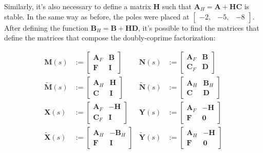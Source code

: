 \documentclass{scrreprt}
\begin{document}
Similarly, it's also necessary to define a matrix $\boldsymbol{H}$ such that $\boldsymbol{A}_H = \boldsymbol{A} + \boldsymbol{HC}$ is stable. In the same way as before, the poles were placed at $\begin{bmatrix}
    -2, & -5, & -8
\end{bmatrix}$. After defining the function $\boldsymbol{B}_H = \boldsymbol{B}+ \boldsymbol{HD}$, it's possible to find the matrices that define the matrices that compose the doubly-coprime factorization:

\begin{align*}
\mathbf{M}(s) &:= \left[ \begin{array}{c|c} \mathbf{A}_F & \mathbf{B} \\ \hline \mathbf{F} & \mathbf{I} \end{array} \right] &
\mathbf{N}(s) &:= \left[ \begin{array}{c|c} \mathbf{A}_F & \mathbf{B} \\ \hline \mathbf{C}_F & \mathbf{D} \end{array} \right] \\[1em]
\tilde{\mathbf{M}}(s) &:= \left[ \begin{array}{c|c} \mathbf{A}_H & \mathbf{H} \\ \hline \mathbf{C} & \mathbf{I} \end{array} \right] &
\tilde{\mathbf{N}}(s) &:= \left[ \begin{array}{c|c} \mathbf{A}_H & \mathbf{B}_H \\ \hline \mathbf{C} & \mathbf{D} \end{array} \right] \\[1.5em]
\mathbf{X}(s) &:= \left[ \begin{array}{c|c} \mathbf{A}_F & -\mathbf{H} \\ \hline \mathbf{C}_F & \mathbf{I} \end{array} \right] &
\mathbf{Y}(s) &:= \left[ \begin{array}{c|c} \mathbf{A}_F & -\mathbf{H} \\ \hline \mathbf{F} & \mathbf{0} \end{array} \right] \\[1em]
\tilde{\mathbf{X}}(s) &:= \left[ \begin{array}{c|c} \mathbf{A}_H & -\mathbf{B}_H \\ \hline \mathbf{F} & \mathbf{I} \end{array} \right] &
\tilde{\mathbf{Y}}(s) &:= \left[ \begin{array}{c|c} \mathbf{A}_H & -\mathbf{H} \\ \hline \mathbf{F} & \mathbf{0} \end{array} \right]
\end{align*}
\end{document}
